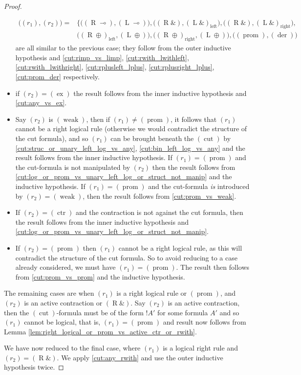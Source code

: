 \documentclass[12pt]{article}
\theoremstyle{plain}
\theoremstyle{definition}
\newcommand{\rimp}{(\operatorname{R} \multimap)}
\newcommand{\limp}{(\operatorname{L} \multimap)}
\newcommand{\rwith}{(\operatorname{R}\&)}
\newcommand{\lwithleft}{(\operatorname{L}\&)_{\operatorname{left}}}
\newcommand{\lwithright}{(\operatorname{L}\&)_{\operatorname{right}}}
\newcommand{\rplusleft}{(\operatorname{R}\oplus)_{\operatorname{left}}}
\newcommand{\rplusright}{(\operatorname{R}\oplus)_{\operatorname{right}}}
\newcommand{\lplus}{(\operatorname{L}\oplus)}
\newcommand{\prom}{(\operatorname{prom})}
\newcommand{\ctr}{(\operatorname{ctr})}
\newcommand{\der}{(\operatorname{der})}
\newcommand{\weak}{(\operatorname{weak})}
\newcommand{\ex}{(\operatorname{ex})}
\newcommand{\cut}{(\operatorname{cut})}
\begin{document}
\begin{proof}
\begin{itemize}
    \begin{align*}
        \big((r_1),(r_2)\big) = &\big\lbrace\big(\rimp, \limp\big), \big(\rwith, \lwithleft\big),\big(\rwith, \lwithright\big),\\
        &\big(\rplusleft, \lplus\big), \big(\rplusright, \lplus\big), \big(\prom, \der\big)
    \end{align*}
    are all similar to the previous case; they follow from the outer inductive hypothesis and \eqref{cut:rimp_vs_limp}, \eqref{cut:rwith_lwithleft}, \eqref{cut:rwith_lwithright}, \eqref{cut:rplusleft_lplus}, \eqref{cut:rplusright_lplus}, \eqref{cut:prom_der} respectively.
    \item if $(r_2) = \ex$ the result follows from the inner inductive hypothesis and \eqref{cut:any_vs_ex}.
    \item Say $(r_2)$ is $\weak$, then if $(r_1) \neq \prom$, it follows that $(r_1)$ cannot be a right logical rule (otherwise we would contradict the structure of the cut formula), and so $(r_1)$ can be brought beneath the $\cut$ by \eqref{cut:struc_or_unary_left_log_vs_any}, \eqref{cut:bin_left_log_vs_any} and the result follows from the inner inductive hypothesis. If $(r_1) = \prom$ and the cut-formula is not manipulated by $(r_2)$ then the result follows from \eqref{cut:log_or_prom_vs_unary_left_log_or_struct_not_manip} and the inductive hypothesis. If $(r_1) = \prom$ and the cut-formula \emph{is} introduced by $(r_2) = \weak$, then the result follows from \eqref{cut:prom_vs_weak}.
    \item If $(r_2) = \ctr$ and the contraction is not against the cut formula, then the result follows from the inner inductive hypothesis and \eqref{cut:log_or_prom_vs_unary_left_log_or_struct_not_manip}.
    \item If $(r_2) = \prom$ then $(r_1)$ cannot be a right logical rule, as this will contradict the structure of the cut formula. So to avoid reducing to a case already considered, we must have $(r_1) = \prom$. The result then follows from \eqref{cut:prom_vs_prom} and the inductive hypothesis.
\end{itemize}
The remaining cases are when $(r_1)$ is a right logical rule or $\prom$, and $(r_2)$ is an active contraction or $\rwith$. Say $(r_2)$ is an active contraction, then the $\cut$-formula must be of the form $!A'$ for some formula $A'$ and so $(r_1)$ cannot be logical, that is, $(r_1) = \prom$ and result now follows from Lemma \ref{lem:right_logical_or_prom_vs_active_ctr_or_rwith}.

We have now reduced to the final case, where $(r_1)$ is a logical right rule and $(r_2) = \rwith$. We apply \eqref{cut:any_rwith} and use the outer inductive hypothesis twice.
\end{proof}
\end{document}
